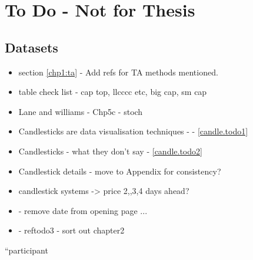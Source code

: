 
\chapter{To Do - Not for Thesis} %

\label{Chapter7} %



\section{Datasets}


\begin{itemize}
\item section \ref{chp1:ta} - Add refs for TA methods mentioned.
\item table check list - cap top, llcccc etc, big cap, sm cap
\item Lane \cite{lane1986using} and williams \cite{williams2011long} \cite{williams1989definitive} - Chp5c - stoch
\item Candlesticks are data visualisation techniques - - \ref{candle.todo1}
\item Candlesticks - what they don't say - \ref{candle.todo2}
\item Candlestick details - move to Appendix for consistency?
\item candlestick systems -> price 2,,3,4 days ahead?
\item - remove date from opening page ...
\item - ref{todo3} - sort out chapter2
\end{itemize}


\textquotedblleft participant